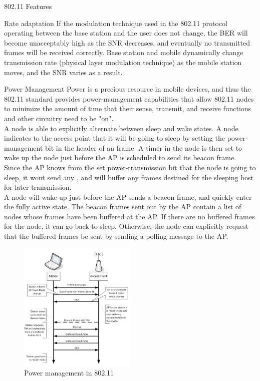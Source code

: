 \begin{section}{802.11 Features}
\begin{subsection}{Rate adaptation}
    If the modulation technique used in the 802.11 protocol operating between the base
    station and the user does not change, the BER will become unacceptably high as the
    SNR decreases, and eventually no transmitted frames will be received correctly.
    Base station and mobile dynamically change transmission rate (physical layer modulation technique) 
    as the mobile station moves, and the SNR varies as a result.
  \end{subsection}
  \begin{subsection}{Power Management}
    Power is a precious resource in mobile devices, and thus the 802.11 standard provides 
    power-management capabilities that allow 802.11 nodes to minimize the amount of time that 
    their sense, transmit, and receive functions and other circuitry need to be "on".\\
    A node is able to explicitly alternate between sleep and wake states. A node indicates to the 
    access point that it will be going to sleep by setting the power-management bit in the header 
    of an frame. A timer in the node is then set to wake up the node just before the AP is 
    scheduled to send its beacon frame.\\
    Since the AP knows from the set power-transmission bit that the node is going to sleep, it wont send any
    , and will buffer any frames destined for the sleeping host for later transmission.\\
    A node will wake up just before the AP sends a beacon frame, and quickly enter the fully active 
    state.
    The beacon frames sent out by the AP contain a list of nodes whose frames have been buffered 
    at the AP. If there are no buffered frames for the node, it can go back to sleep. Otherwise, 
    the node can explicitly request that the buffered frames be sent by sending a polling message 
    to the AP.

    \begin{figure}[h]
      \centering
      \includegraphics[width=0.5\textwidth]{img/wireless/80211 power saving.png}
      \caption{Power management in 802.11}
    \end{figure}

  \end{subsection}

\end{section}



